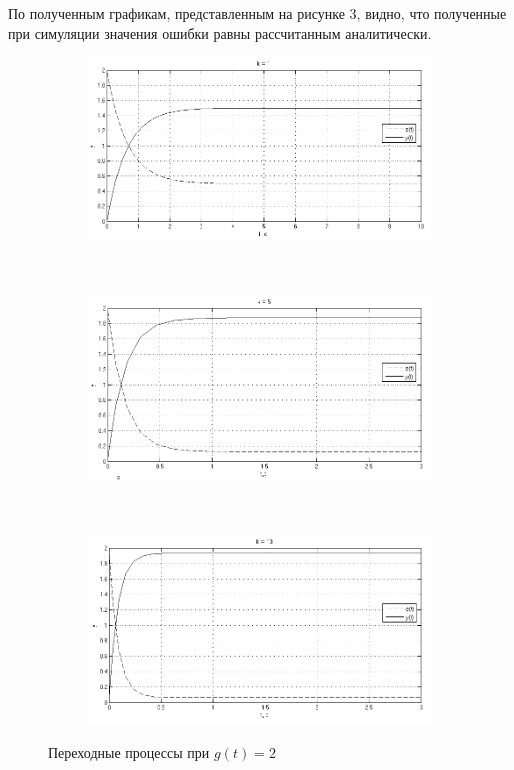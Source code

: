 \documentclass[a4paper, 11pt, russian]{article}
\begin{document}
    По полученным графикам, представленным на рисунке 3, видно, что полученные при симуляции значения ошибки равны рассчитанным аналитически.\\
    \begin{figure}[hp]
        \begin{subfigure}[h]{1in}
            \centering
            \includegraphics[scale = 0.75]{constInput0ast1k.png}
        \end{subfigure}\\
        \begin{subfigure}[h]{1in}
            \centering
            \includegraphics[scale = 0.75]{constInput0ast5k.png}
        \end{subfigure}\\
        \begin{subfigure}[h]{1in}
            \centering
            \includegraphics[scale = 0.75]{constInput0ast10k.png}
        \end{subfigure}
        \caption{Переходные процессы при $g(t) = 2$}
    \end{figure}
    \vspace{1.5cm} %
\end{document}
